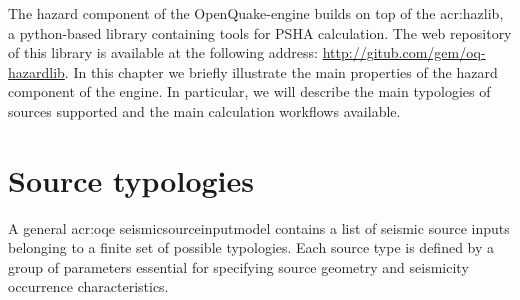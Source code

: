 The hazard component of the OpenQuake-engine builds on top of the 
\gls{acr:hazlib}, a python-based library containing
tools for PSHA calculation. 
%
The web repository of this library is available at the following address: 
\href{http://gitub.com/gem/oq-hazardlib}{http://gitub.com/gem/oq-hazardlib}.
%
In this chapter we briefly illustrate the main properties of the 
hazard component of the engine. 
%
In particular, we will describe the main typologies of sources supported 
and the main calculation workflows available.
%
\section{Source typologies}
A general \gls{acr:oqe} \gls{seismicsourceinputmodel} contains a list
of seismic source inputs belonging to a finite set of possible 
typologies. Each source type is defined by a group of parameters 
essential for specifying source geometry and seismicity occurrence 
characteristics.
 
